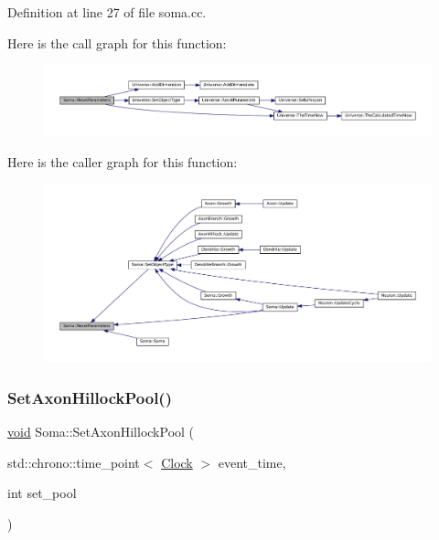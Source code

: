 Definition at line 27 of file soma.\+cc.

Here is the call graph for this function\+:\nopagebreak
\begin{figure}[H]
\begin{center}
\leavevmode
\includegraphics[width=350pt]{class_soma_a82f016dc126f7d1053e5eb455d28c44b_cgraph}
\end{center}
\end{figure}
Here is the caller graph for this function\+:\nopagebreak
\begin{figure}[H]
\begin{center}
\leavevmode
\includegraphics[width=350pt]{class_soma_a82f016dc126f7d1053e5eb455d28c44b_icgraph}
\end{center}
\end{figure}
\mbox{\label{class_soma_a67cdb8d00b7130b44d4ac75468f4b385}} 
\subsubsection{\texorpdfstring{Set\+Axon\+Hillock\+Pool()}{SetAxonHillockPool()}}
{\footnotesize\ttfamily \mbox{\hyperlink{glad_8h_a950fc91edb4504f62f1c577bf4727c29}{void}} Soma\+::\+Set\+Axon\+Hillock\+Pool (\begin{DoxyParamCaption}\item[{std\+::chrono\+::time\+\_\+point$<$ \mbox{\hyperlink{universe_8h_a0ef8d951d1ca5ab3cfaf7ab4c7a6fd80}{Clock}} $>$}]{event\+\_\+time,  }\item[{int}]{set\+\_\+pool }\end{DoxyParamCaption})\hspace{0.3cm}{\ttfamily [inline]}}



